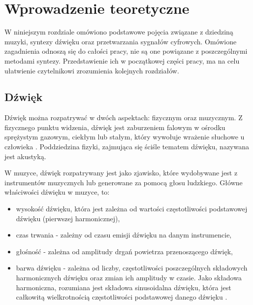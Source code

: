 \chapter{Wprowadzenie teoretyczne}\label{chapter2}

W niniejszym rozdziale omówiono podstawowe pojęcia związane z dziedziną muzyki, syntezy dźwięku oraz przetwarzania sygnałów cyfrowych. Omówione zagadnienia odnoszą się do całości pracy, nie są one powiązane z poszczególnymi metodami syntezy. Przedstawienie ich w początkowej części pracy, ma na celu ułatwienie czytelnikowi zrozumienia kolejnych rozdziałów.



\section{Dźwięk}
Dźwięk można rozpatrywać w dwóch aspektach: fizycznym oraz muzycznym. Z fizycznego punktu widzenia, dźwięk jest zaburzeniem falowym w ośrodku sprężystym gazowym, ciekłym lub stałym, który wywołuje wrażenie słuchowe u człowieka \cite{dzwiek_pwn}. Poddziedzina fizyki, zajmująca się ściśle tematem dźwięku, nazywana jest akustyką.

W muzyce, dźwięk rozpatrywany jest jako zjawisko, które wydobywane jest z instrumentów muzycznych lub generowane za pomocą głosu ludzkiego. Główne właściwości dźwięku w muzyce, to:

\begin{itemize}
	\item wysokość dźwięku, która jest zależna od wartości częstotliwości podstawowej dźwięku (pierwszej harmonicznej),
	
	\item czas trwania - zależny od czasu emisji dźwięku na danym instrumencie,
	
	\item głośność - zależna od amplitudy drgań powietrza przenoszącego dźwięk,
	
	\item barwa dźwięku - zależna od liczby, częstotliwości poszczególnych składowych harmonicznych dźwięku oraz zmian ich amplitudy w czasie. Jako składowa harmoniczna, rozumiana jest składowa sinusoidalna dźwięku, która jest całkowitą wielkrotnością częstotliwości podstawowej danego dźwięku \cite{synth_brief_intro}.
\end{itemize}

